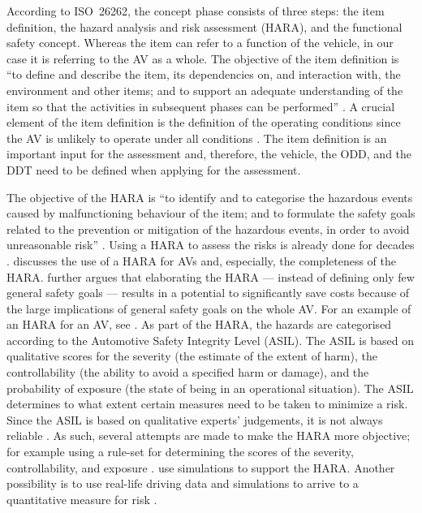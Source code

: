 According to ISO~26262, the concept phase consists of three steps: the item definition, the hazard analysis and risk assessment (HARA), and the functional safety concept. Whereas the item can refer to a function of the vehicle, in our case it is referring to the AV as a whole. The objective of the item definition is ``to define and describe the item, its dependencies on, and interaction with, the environment and other items; and to support an adequate understanding of the item so that the activities in subsequent phases can be performed'' \cite[Clause 3.5]{ISO26262}. A crucial element of the item definition is the definition of the operating conditions since the AV is unlikely to operate under all conditions \cite{koopman2016challenges}. The item definition is an important input for the assessment and, therefore, the vehicle, the ODD, and the DDT need to be defined when applying for the assessment.

The objective of the HARA is ``to identify and to categorise the hazardous events caused by malfunctioning behaviour of the item; and to formulate the safety goals related to the prevention or mitigation of the hazardous events, in order to avoid unreasonable risk'' \cite[Clause 3.6]{ISO26262}. Using a HARA to assess the risks is already done for decades \cite{sage1980methodologies}. \textcite{johansson2015importance} discusses the use of a HARA for AVs and, especially, the completeness of the HARA. \textcite{johansson2015importance} further argues that elaborating the HARA --- instead of defining only few general safety goals --- results in a potential to significantly save costs because of the large implications of general safety goals on the whole AV. For an example of an HARA for an AV, see \cite{stolte2017hara}. As part of the HARA, the hazards are categorised according to the Automotive Safety Integrity Level (ASIL). The ASIL is based on qualitative scores for the severity (the estimate of the extent of harm), the controllability (the ability to avoid a specified harm or damage), and the probability of exposure (the state of being in an operational situation). The ASIL determines to what extent certain measures need to be taken to minimize a risk. Since the ASIL is based on qualitative experts' judgements, it is not always reliable \cite{khastgir2017towards}. As such, several attempts are made to make the HARA more objective; for example using a rule-set for determining the scores of the severity, controllability, and exposure \cite{khastgir2017towards}. \textcite{duracz2015rigorous} use simulations to support the HARA. Another possibility is to use real-life driving data and simulations to arrive to a quantitative measure for risk \cite{degelder2019risk}.

